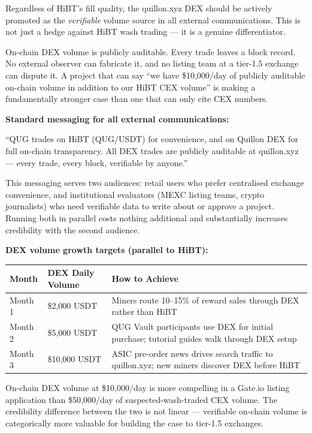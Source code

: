 \documentclass[11pt,a4paper]{article}
\begin{document}
Regardless of HiBT's fill quality, the quillon.xyz DEX should be actively promoted as the \emph{verifiable} volume source in all external communications. This is not just a hedge against HiBT wash trading — it is a genuine differentiator.

On-chain DEX volume is publicly auditable. Every trade leaves a block record. No external observer can fabricate it, and no listing team at a tier-1.5 exchange can dispute it. A project that can say ``we have \$10,000/day of publicly auditable on-chain volume in addition to our HiBT CEX volume'' is making a fundamentally stronger case than one that can only cite CEX numbers.

\begin{tcolorbox}[bluebox]
\textbf{Standard messaging for all external communications:}

\medskip
``QUG trades on HiBT (QUG/USDT) for convenience, and on Quillon DEX for full on-chain transparency. All DEX trades are publicly auditable at quillon.xyz — every trade, every block, verifiable by anyone.''

\medskip
This messaging serves two audiences: retail users who prefer centralised exchange convenience, and institutional evaluators (MEXC listing teams, crypto journalists) who need verifiable data to write about or approve a project. Running both in parallel costs nothing additional and substantially increases credibility with the second audience.
\end{tcolorbox}

\textbf{DEX volume growth targets (parallel to HiBT):}

\begin{center}
\begin{tabular}{C{2.5cm} C{3cm} L{6.5cm}}
  \toprule
  \textbf{Month} & \textbf{DEX Daily Volume} & \textbf{How to Achieve} \\
  \midrule
  Month 1 & \$2,000 USDT & Miners route 10--15\% of reward sales through DEX rather than HiBT \\
  Month 2 & \$5,000 USDT & QUG Vault participants use DEX for initial purchase; tutorial guides walk through DEX setup \\
  Month 3 & \$10,000 USDT & ASIC pre-order news drives search traffic to quillon.xyz; new miners discover DEX before HiBT \\
  \bottomrule
\end{tabular}
\end{center}

On-chain DEX volume at \$10,000/day is more compelling in a Gate.io listing application than \$50,000/day of suspected-wash-traded CEX volume. The credibility difference between the two is not linear — verifiable on-chain volume is categorically more valuable for building the case to tier-1.5 exchanges.
\end{document}
